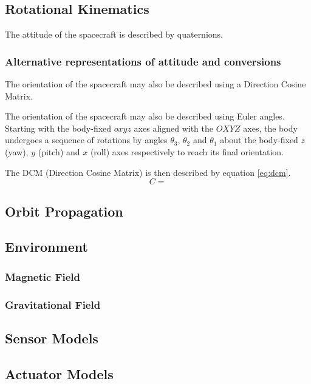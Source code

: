 \subsection{Rotational Kinematics}

The attitude of the spacecraft is described by quaternions.

\subsubsection{Alternative representations of attitude and conversions}
The orientation of the spacecraft may also be described using a Direction Cosine Matrix.

The orientation of the spacecraft may also be described using Euler angles.
Starting with the body-fixed $oxyz$ axes aligned with the $OXYZ$ axes, the body undergoes a sequence of rotations by angles $\theta_3$, $\theta_2$ and $\theta_1$ about the body-fixed $z$ (yaw), $y$ (pitch) and $x$ (roll) axes respectively to reach its final orientation.

The DCM (Direction Cosine Matrix) is then described by equation \ref{eq:dcm}.
\begin{equation} \label{eq:dcm}
C = 
\end{equation}

\subsection{Orbit Propagation}

\subsection{Environment}
\subsubsection{Magnetic Field}
\subsubsection{Gravitational Field}

\subsection{Sensor Models}

\subsection{Actuator Models}

